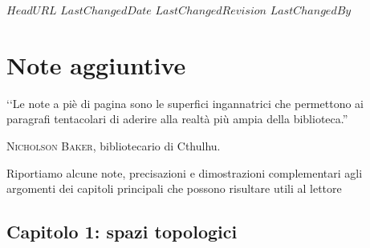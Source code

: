 \svnidlong
{$HeadURL$}
{$LastChangedDate$}
{$LastChangedRevision$}
{$LastChangedBy$}

\chapter{Note aggiuntive}
\begin{introduction}
‘‘Le note a piè di pagina sono le superfici ingannatrici che permettono ai paragrafi tentacolari di aderire alla realtà più ampia della biblioteca.''
\begin{flushright}
	\textsc{Nicholson Baker,} bibliotecario di Cthulhu.
\end{flushright}
\end{introduction}

\noindent Riportiamo alcune note, precisazioni e dimostrazioni complementari agli argomenti dei capitoli principali che possono risultare utili al lettore
\section{Capitolo 1: spazi topologici}
